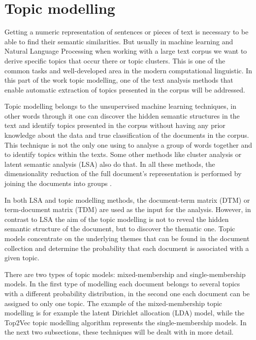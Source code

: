 \documentclass[fontsize=12pt,a4paper,twoside,openany]{scrbook}
\begin{document}
\section{Topic modelling}
\label{sec:B}

Getting a numeric representation of sentences or pieces of text is necessary to be able to find their semantic similarities. But usually in machine learning and Natural Language Processing when working with a large text corpus we want to derive specific topics that occur there or topic clusters. This is one of the common tasks and well-developed area in the modern computational linguistic. In this part of the work topic modelling, one of the text analysis methods that enable automatic extraction of topics presented in the corpus will be addressed.

Topic modelling belongs to the unsupervised machine learning techniques, in other words through it one can discover the hidden semantic structures in the text and identify topics presented in the corpus without having any prior knowledge about the data and true classification of the documents in the corpus. This technique is not the only one using to analyse a group of words together and to identify topics within the texts. Some other methods like cluster analysis or latent semantic analysis (LSA) \parencite[see][]{Foltz96, Landauer2007} also do that. In all these methods, the dimensionality reduction of the full document's representation is performed by joining the documents into groups \parencite{Anandarajan18}. 

In both LSA and topic modelling methods, the document-term matrix (DTM) or term-document matrix (TDM) are used as the input for the analysis. However, in contrast to LSA the aim of the topic modelling is not to reveal the hidden semantic structure of the document, but to discover the thematic one. Topic models concentrate on the underlying themes that can be found in the document collection and determine the probability that each document is associated with a given topic. 

There are two types of topic models: mixed-membership and single-membership models. In the first type of modelling each document belongs to several topics with a different probability distribution, in the second one each document can be assigned to only one topic. The example of the mixed-membership topic modelling is for example the latent Dirichlet allocation (LDA) model, while the Top2Vec topic modelling algorithm represents the single-membership models. In the next two subsections, these techniques will be dealt with in more detail.
\end{document}
